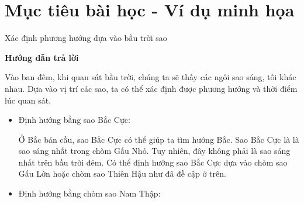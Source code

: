 \section{Mục tiêu bài học - Ví dụ minh họa}
\begin{dang}{Xác định phương hướng dựa vào bầu trời sao}
	{	\begin{center}
			\textbf{Hướng dẫn trả lời}
		\end{center}
		
		Vào ban đêm, khi quan sát bầu trời, chúng ta sẽ thấy các ngôi sao sáng, tối khác nhau. Dựa vào vị trí các sao, ta có thể xác định được phương hướng và thời điểm lúc quan sát.
		\begin{itemize}
			\item Định hướng bằng sao Bắc Cực:
			
			Ở Bắc bán cầu, sao Bắc Cực có thể giúp ta tìm hướng Bắc. Sao Bắc Cực là là sao sáng nhất trong chòm Gấu Nhỏ. Tuy nhiên, đây không phải là sao sáng nhất trên bầu trời đêm. Có thể định hướng sao Bắc Cực dựa vào chòm sao Gấu Lớn hoặc chòm sao Thiên Hậu như đã đề cập ở trên.
			
			\item Định hướng bằng chòm sao Nam Thập:
			

\end{itemize}}
\end{dang}
